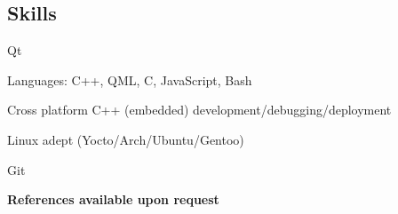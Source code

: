 \documentclass{article}
\begin{document}
\subsection*{Skills}
\begin{itemize*}
\item{Qt}
\item{Languages: C++, QML, C, JavaScript, Bash}
\item{Cross platform C++ (embedded) development/debugging/deployment}
\item{Linux adept (Yocto/Arch/Ubuntu/Gentoo)}
\item{Git}
\end{itemize*}

\bf{References available upon request}
 
\end{document}
